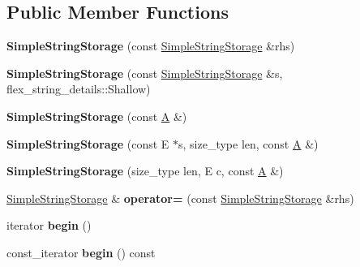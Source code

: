 \subsection*{Public Member Functions}
\begin{DoxyCompactItemize}
\item 
\hypertarget{classSimpleStringStorage_a092ed7bcc3479e620a7aec7daa89c96b}{}{\bfseries Simple\+String\+Storage} (const \hyperlink{classSimpleStringStorage}{Simple\+String\+Storage} \&rhs)\label{classSimpleStringStorage_a092ed7bcc3479e620a7aec7daa89c96b}

\item 
\hypertarget{classSimpleStringStorage_a19b1ef631586bcfbf599a74056dc803a}{}{\bfseries Simple\+String\+Storage} (const \hyperlink{classSimpleStringStorage}{Simple\+String\+Storage} \&s, flex\+\_\+string\+\_\+details\+::\+Shallow)\label{classSimpleStringStorage_a19b1ef631586bcfbf599a74056dc803a}

\item 
\hypertarget{classSimpleStringStorage_aea84482bda5d0be0f9718b23f10f2b05}{}{\bfseries Simple\+String\+Storage} (const \hyperlink{structA}{A} \&)\label{classSimpleStringStorage_aea84482bda5d0be0f9718b23f10f2b05}

\item 
\hypertarget{classSimpleStringStorage_a761af238b684ef055dcd639ea4778aaa}{}{\bfseries Simple\+String\+Storage} (const E $\ast$s, size\+\_\+type len, const \hyperlink{structA}{A} \&)\label{classSimpleStringStorage_a761af238b684ef055dcd639ea4778aaa}

\item 
\hypertarget{classSimpleStringStorage_a8a445351b97000749aa193bacf62f000}{}{\bfseries Simple\+String\+Storage} (size\+\_\+type len, E c, const \hyperlink{structA}{A} \&)\label{classSimpleStringStorage_a8a445351b97000749aa193bacf62f000}

\item 
\hypertarget{classSimpleStringStorage_a347b6449f6ec39789cf623bfdbb8e026}{}\hyperlink{classSimpleStringStorage}{Simple\+String\+Storage} \& {\bfseries operator=} (const \hyperlink{classSimpleStringStorage}{Simple\+String\+Storage} \&rhs)\label{classSimpleStringStorage_a347b6449f6ec39789cf623bfdbb8e026}

\item 
\hypertarget{classSimpleStringStorage_a24b5dc204ba091bb7acbd3b9b0a8416c}{}iterator {\bfseries begin} ()\label{classSimpleStringStorage_a24b5dc204ba091bb7acbd3b9b0a8416c}

\item 
\hypertarget{classSimpleStringStorage_a78058e4d847fd4966012195b6ec9beec}{}const\+\_\+iterator {\bfseries begin} () const \label{classSimpleStringStorage_a78058e4d847fd4966012195b6ec9beec}


\end{DoxyCompactItemize}
